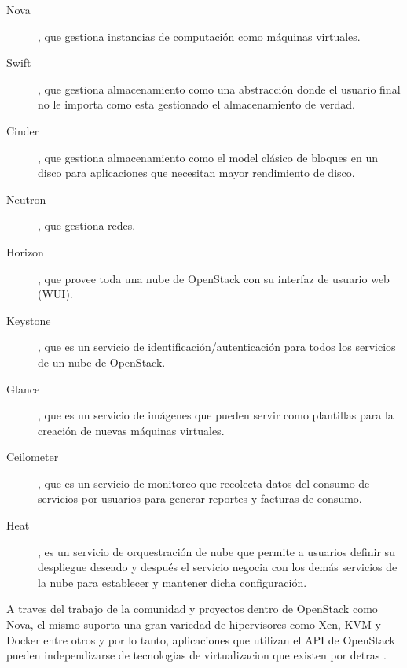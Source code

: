\begin{description}
	\item[Nova], que gestiona instancias de computación como máquinas virtuales.
    \item[Swift], que gestiona almacenamiento como una abstracción donde el usuario final no le importa como esta gestionado el almacenamiento de verdad.
    \item[Cinder], que gestiona almacenamiento como el model clásico de bloques en un disco para aplicaciones que necesitan mayor rendimiento de disco.
    \item[Neutron], que gestiona redes.
    \item[Horizon], que provee toda una nube de OpenStack con su interfaz de usuario web (WUI).
    \item[Keystone], que es un servicio de identificación/autenticación para todos los servicios de un nube de OpenStack.
    \item[Glance], que es un servicio de imágenes que pueden servir como plantillas para la creación de nuevas máquinas virtuales.
    \item[Ceilometer], que es un servicio de monitoreo que recolecta datos del consumo de servicios por usuarios para generar reportes y facturas de consumo.
    \item[Heat], es un servicio de orquestración de nube que permite a usuarios definir su despliegue deseado y después el servicio negocia con los demás servicios de la nube para establecer y mantener dicha configuración.
\end{description} \citep{OpenSource-OpenStack}

A traves del trabajo de la comunidad y proyectos dentro de OpenStack como Nova, el mismo suporta una gran variedad de hipervisores como Xen, KVM y Docker entre otros y por lo tanto, aplicaciones que utilizan el API de OpenStack pueden independizarse de tecnologias de virtualizacion que existen por detras \citep{OpenStack-Nova-Support-Matrix} \citep{OpenStack-Nova-Docker}.

